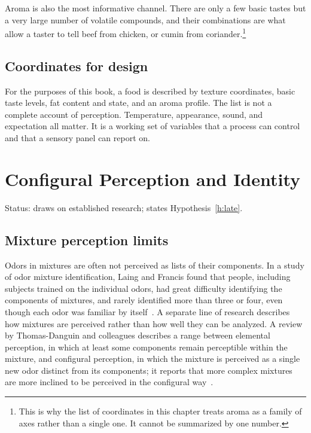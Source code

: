 \documentclass[11pt,openany]{book}
\theoremstyle{definition}
\begin{document}
Aroma is also the most informative channel. There are only a few basic tastes but a very large number of volatile compounds, and their combinations are what allow a taster to tell beef from chicken, or cumin from coriander.\footnote{This is why the list of coordinates in this chapter treats aroma as a family of axes rather than a single one. It cannot be summarized by one number.}

\section{Coordinates for design}

For the purposes of this book, a food is described by texture coordinates, basic taste levels, fat content and state, and an aroma profile. The list is not a complete account of perception. Temperature, appearance, sound, and expectation all matter. It is a working set of variables that a process can control and that a sensory panel can report on.

\chapter{Configural Perception and Identity}\label{ch:config}

Status: draws on established research; states Hypothesis~\ref{h:late}.

\section{Mixture perception limits}

Odors in mixtures are often not perceived as lists of their components. In a study of odor mixture identification, Laing and Francis found that people, including subjects trained on the individual odors, had great difficulty identifying the components of mixtures, and rarely identified more than three or four, even though each odor was familiar by itself~\cite{laing1989}. A separate line of research describes how mixtures are perceived rather than how well they can be analyzed. A review by Thomas-Danguin and colleagues describes a range between elemental perception, in which at least some components remain perceptible within the mixture, and configural perception, in which the mixture is perceived as a single new odor distinct from its components; it reports that more complex mixtures are more inclined to be perceived in the configural way~\cite{thomasdanguin2014}.
\end{document}
